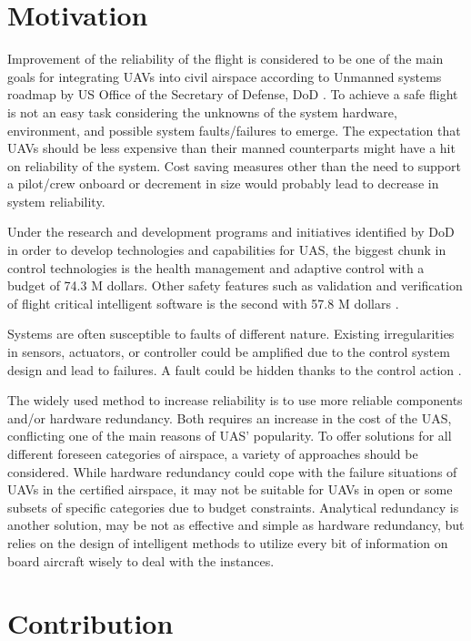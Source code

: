 \section{Motivation}

Improvement of the reliability of the flight is considered to be one of the main goals for integrating UAVs into civil airspace according to Unmanned systems roadmap by US Office of the Secretary of Defense, DoD \cite{UnmannedSystemsRoadmapDoD}. 
To achieve a safe flight is not an easy task considering the unknowns of the system hardware, environment, and possible system faults/failures to emerge. 
The expectation that UAVs should be less expensive than their manned counterparts might have a hit on reliability of the system. Cost saving measures other than the need to support a pilot/crew onboard or decrement in size would probably lead to decrease in system reliability.

Under the research and development programs and initiatives identified by DoD in order to develop technologies and capabilities for UAS, the biggest chunk in control technologies is the health management and adaptive control with a budget of 74.3 M dollars. 
Other safety features such as validation and verification of flight critical intelligent software is the second with 57.8 M dollars \cite{UnmannedSystemsRoadmapDoD}. 

Systems are often susceptible to faults of different nature. Existing irregularities in sensors, actuators, or controller could be amplified due to the control system design and lead to failures. A fault could be hidden thanks to the control action \cite{ducard2009fault}.

The widely used method to increase reliability is to use more reliable components and/or hardware redundancy. Both requires an increase in the cost of the UAS, conflicting one of the main reasons of UAS' popularity\cite{angelov2012sense}. To offer solutions for all different foreseen categories of airspace, a variety of approaches should be considered. While hardware redundancy could cope with the failure situations of UAVs in the certified airspace, it may not be suitable for UAVs in open or some subsets of specific categories due to budget constraints. Analytical redundancy is another solution, may be not as effective and simple as hardware redundancy, but relies on the design of intelligent methods to utilize every bit of information on board aircraft wisely to deal with the instances.  

\section{Contribution}

